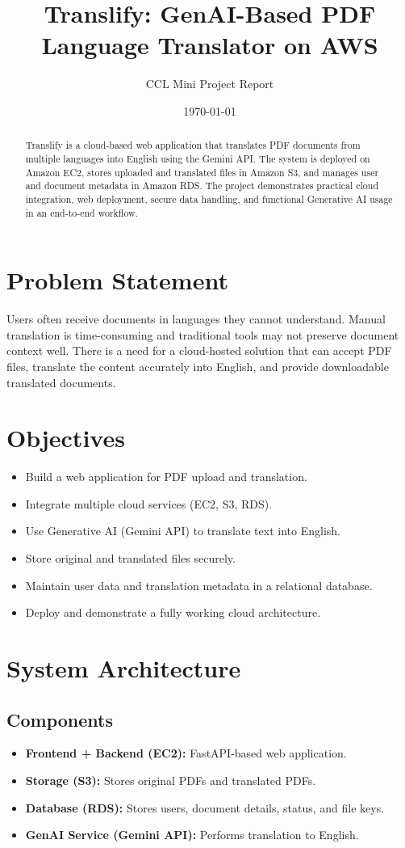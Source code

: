 \documentclass[12pt]{article}
\title{Translify: GenAI-Based PDF Language Translator on AWS}
\author{CCL Mini Project Report}
\date{\today}
\begin{document}
\maketitle

\begin{abstract}
Translify is a cloud-based web application that translates PDF documents from multiple languages into English using the Gemini API. The system is deployed on Amazon EC2, stores uploaded and translated files in Amazon S3, and manages user and document metadata in Amazon RDS. The project demonstrates practical cloud integration, web deployment, secure data handling, and functional Generative AI usage in an end-to-end workflow.
\end{abstract}

\section{Problem Statement}
Users often receive documents in languages they cannot understand. Manual translation is time-consuming and traditional tools may not preserve document context well. There is a need for a cloud-hosted solution that can accept PDF files, translate the content accurately into English, and provide downloadable translated documents.

\section{Objectives}
\begin{itemize}[leftmargin=*]
    \item Build a web application for PDF upload and translation.
    \item Integrate multiple cloud services (EC2, S3, RDS).
    \item Use Generative AI (Gemini API) to translate text into English.
    \item Store original and translated files securely.
    \item Maintain user data and translation metadata in a relational database.
    \item Deploy and demonstrate a fully working cloud architecture.
\end{itemize}

\section{System Architecture}
\subsection*{Components}
\begin{itemize}[leftmargin=*]
    \item \textbf{Frontend + Backend (EC2):} FastAPI-based web application.
    \item \textbf{Storage (S3):} Stores original PDFs and translated PDFs.
    \item \textbf{Database (RDS):} Stores users, document details, status, and file keys.
    \item \textbf{GenAI Service (Gemini API):} Performs translation to English.
\end{itemize}
\end{document}

